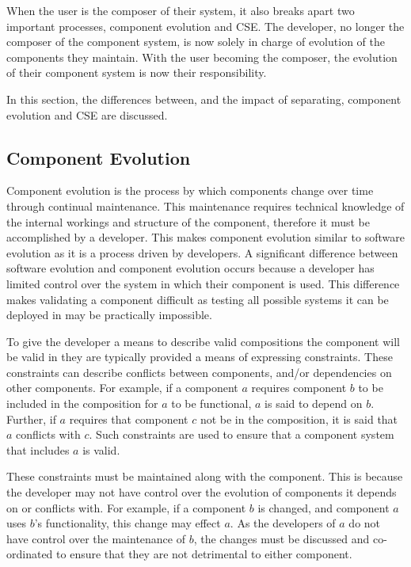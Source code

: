 When the user is the composer of their system, it also breaks apart two important processes,
component evolution and CSE.
The developer, no longer the composer of the component system, is now solely in charge of evolution of the components they maintain. 
With the user becoming the composer, the evolution of their component system is now their responsibility. 

In this section, the differences between, and the impact of separating, component evolution and CSE are discussed.

\subsection{Component Evolution}
Component evolution is the process by which components change over time through continual maintenance.
This maintenance requires technical knowledge of the internal workings and structure of the component, therefore it must be accomplished by a developer.
This makes component evolution similar to software evolution as it is a process driven by developers.
A significant difference between software evolution and component evolution occurs because a developer has limited control over the system in which their component is used.
This difference makes validating a component difficult as testing all possible systems it can be deployed in may be practically impossible.

To give the developer a means to describe valid compositions the component will be valid in
they are typically provided a means of expressing constraints.
These constraints can describe conflicts between components, and/or dependencies on other components.
For example, if a component $a$ requires component $b$ to be included in the composition for $a$ to be functional, $a$ is said to depend on $b$.
Further, if $a$ requires that component $c$ not be in the composition, it is said that $a$ conflicts with $c$.
Such constraints are used to ensure that a component system that includes $a$ is valid. 
 
These constraints must be maintained along with the component. 
This is because the developer may not have control over the evolution of components it depends on or conflicts with.
For example, if a component $b$ is changed, and component $a$ uses $b$'s functionality, this change may effect $a$.
As the developers of $a$ do not have control over the maintenance of $b$, 
the changes must be discussed and co-ordinated to ensure that they are not detrimental to either component.

